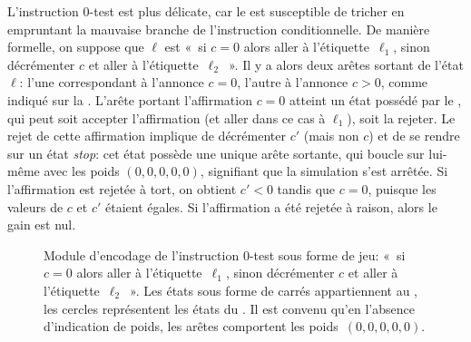 L'instruction $0$-test est plus délicate, car le \jo est susceptible de tricher en empruntant la mauvaise branche de l'instruction conditionnelle.
De manière formelle, on suppose que $\ell$ est « si $c=0$ alors aller à l'étiquette~$\ell_1$, sinon décrémenter $c$ et aller à l'étiquette~$\ell_2$ ».
Il y a alors deux arêtes sortant de l'état $\ell$: l'une correspondant à l'annonce $c=0$, l'autre à l'annonce $c>0$, comme indiqué sur la .
L'arête portant l'affirmation $c=0$ atteint un état possédé par le \ji, qui peut soit accepter l'affirmation (et aller dans ce cas à $\ell_1$), soit la rejeter.
Le rejet de cette affirmation implique de décrémenter $c'$ (mais non $c$) et de se rendre sur un état \emph{stop}: cet état possède une unique arête sortante, qui boucle sur lui-même avec les poids $(0,0,0,0,0)$, signifiant que la simulation s'est arrêtée.
Si l'affirmation est rejetée à tort, on obtient $c'<0$ tandis que $c=0$, puisque les valeurs de $c$ et $c'$ étaient égales.
Si l'affirmation a été rejetée à raison, alors le gain est nul.

\begin{figure}[ht]
\centering
{}
\caption[Module d'encodage de l'instruction $0$-test sous forme de jeu.]{Module d'encodage de l'instruction $0$-test sous forme de jeu: « si $c=0$ alors aller à l'étiquette~$\ell_1$, sinon décrémenter $c$ et aller à l'étiquette~$\ell_2$ ». Les états sous forme de carrés appartiennent au \jo, les cercles représentent les états du \ji. Il est convenu qu'en l'absence d'indication de poids, les arêtes comportent les poids~$(0,0,0,0,0)$.}%
\label{tj:fig:zerotest}
\end{figure}

